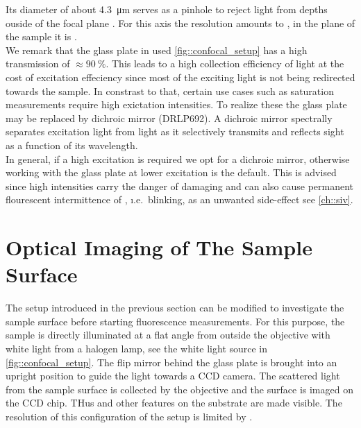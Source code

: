 		Its diameter of about \SI{4.3}{\micro\meter} serves as a pinhole to reject \pl light from depths ouside of the focal plane \cite{Santori2010}.
		For this axis the resolution amounts to , in the plane of the sample it is .
		\\
		We remark that the glass plate in used \autoref{fig::confocal_setup} has a high transmission of $\approx \SI{90}{\percent}$. This leads to a high collection efficiency of \fl light at the cost of excitation effeciency since most of the exciting light is not being redirected towards the sample. In constrast to that, certain use cases such as saturation measurements require high exictation intensities. To realize these the glass plate may be replaced by dichroic mirror (DRLP692). A dichroic mirror spectrally separates excitation light from \pl light as it selectively transmits and reflects sight as a function of its wavelength.
		\\
		In general, if a high excitation is required we opt for a dichroic mirror, otherwise working with the glass plate at lower excitation is the default. This is advised since high intensities carry the danger of damaging \sivs and can also cause permanent flourescent intermittence of \sivs, \i.e.\ blinking, as an unwanted side-effect see \autoref{ch::siv}.

	\section[Surface Imaging]{Optical Imaging of The Sample Surface} \label{sec::methods_optical}

		The setup introduced in the previous section can be modified to investigate the sample surface before starting fluorescence measurements.
		For this purpose, the sample is directly illuminated at a flat angle from outside the objective with white light from a halogen lamp, see the white light source in \autoref{fig::confocal_setup}.
		The flip mirror behind the glass plate is brought into an upright position to guide the light towards a CCD camera.
		The scattered light from the sample surface is collected by the objective and the surface is imaged on the CCD chip.
		THus \nds and other features on the substrate are made visible.
		The resolution of this configuration of the setup is limited by .

